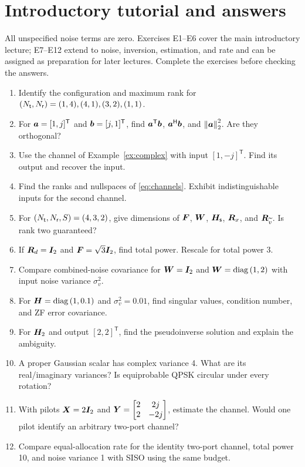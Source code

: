 \section{Introductory tutorial and answers}
All unspecified noise terms are zero. Exercises E1--E6 cover the main introductory lecture; E7--E12 extend to noise, inversion, estimation, and rate and can be assigned as preparation for later lectures. Complete the exercises before checking the answers.
\begin{enumerate}[label=\textbf{E\arabic*.}]
\item Identify the configuration and maximum rank for $(N_{\mathsf{t}},N_{\mathsf{r}})=(1,4),(4,1),(3,2),(1,1)$.
\item For $\bm{a}=[1,j]^{\mathsf T}$ and $\bm{b}=[j,1]^{\mathsf T}$, find ${\bm{a}}^{\mathsf{T}}\bm{b}$, ${\bm{a}}^{\mathsf{H}}\bm{b}$, and $\left\|\bm{a}\right\|_2^2$. Are they orthogonal?
\item Use the channel of Example~\ref{ex:complex} with input $[1,-j]^{\mathsf T}$. Find its output and recover the input.
\item Find the ranks and nullspaces of \eqref{eq:channels}. Exhibit indistinguishable inputs for the second channel.
\item For $(N_{\mathsf{t}},N_{\mathsf{r}},S)=(4,3,2)$, give dimensions of $\bm{F}$, $\bm{W}$, $\bm{H}_{\mathsf{s}}$, $\bm{R}_x$, and $\bm{R}_{\widetilde v}$. Is rank two guaranteed?
\item If $\bm{R}_d=\bm{I}_2$ and $\bm{F}=\sqrt3\bm{I}_2$, find total power. Rescale for total power 3.
\item Compare combined-noise covariance for $\bm{W}=\bm{I}_2$ and $\bm{W}=\operatorname{diag}\left(1,2\right)$ with input noise variance $\sigma_v^2$.
\item For $\bm{H}=\operatorname{diag}\left(1,0.1\right)$ and $\sigma_v^2=0.01$, find singular values, condition number, and ZF error covariance.
\item For $\bm{H}_2$ and output $[2,2]^{\mathsf T}$, find the pseudoinverse solution and explain the ambiguity.
\item A proper Gaussian scalar has complex variance 4. What are its real/imaginary variances? Is equiprobable QPSK circular under every rotation?
\item With pilots $\bm{X}=2\bm{I}_2$ and $\bm{Y}=\begin{bmatrix}2&2j\\2&-2j\end{bmatrix}$, estimate the channel. Would one pilot identify an arbitrary two-port channel?
\item Compare equal-allocation rate for the identity two-port channel, total power 10, and noise variance 1 with SISO using the same budget.
\end{enumerate}
\clearpage
